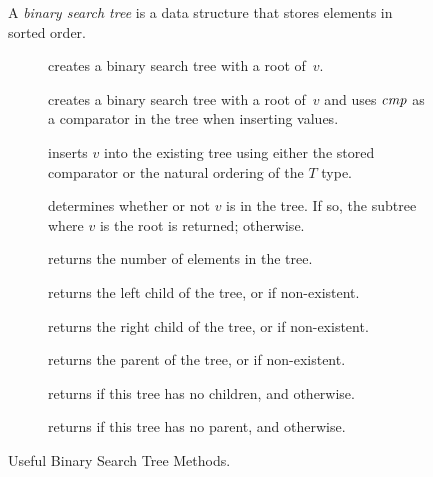 \begin{figure}[tp]
    \small
    \begin{tcolorbox}[title=Teaching Java Binary Search Trees]
      A \emph{binary search tree} is a data structure that stores elements in sorted order.
      \vspace{2ex}
    \begin{description}
      \item [] creates a binary search tree with a root of~$v$.
      \item [] creates a binary search tree with a root of~$v$ and uses $\emph{cmp}$ as a comparator in the tree when inserting values.
      \item [] inserts $v$ into the existing tree using either the stored comparator or the natural ordering of the $T$ type.
      \item [] determines whether or not $v$ is in the tree. If so, the subtree where $v$ is the root is returned;  otherwise.
      \item [] returns the number of elements in the tree.
      \item [] returns the left child of the tree, or  if non-existent.
      \item [] returns the right child of the tree, or  if non-existent.
      \item [] returns the parent of the tree, or  if non-existent.
      \item [] returns  if this tree has no children, and  otherwise.
      \item [] returns  if this tree has no parent, and  otherwise.
    \end{description}
  \end{tcolorbox}
    \caption{Useful Binary Search Tree Methods.}
    \label{fig:bstmethods}
  \end{figure}

